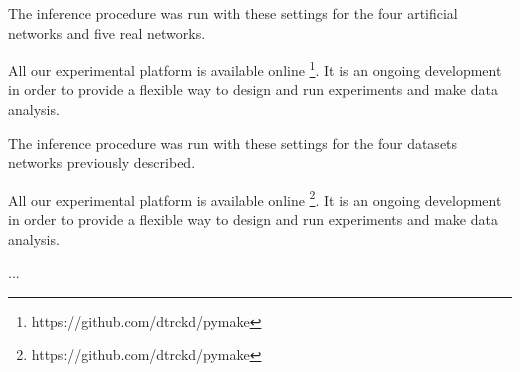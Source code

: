 The inference procedure was run with these settings for the four artificial networks  and five real networks.

All our experimental platform is available online \footnote{https://github.com/dtrckd/pymake}. It is an ongoing development in order to provide a flexible way to design and run experiments and make data analysis.


The inference procedure was run with these settings for the four datasets networks previously described.

All our experimental platform is available online \footnote{https://github.com/dtrckd/pymake}. It is an ongoing development in order to provide a flexible way to design and run experiments and make data analysis.

...
